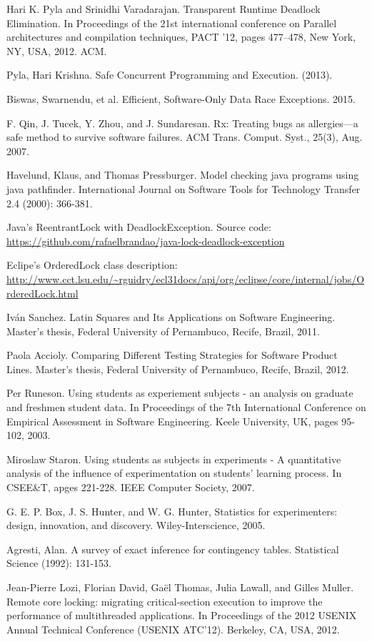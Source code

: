 \begin{thebibliography}{4}
 Hari K. Pyla and Srinidhi Varadarajan. Transparent Runtime Deadlock Elimination. In
Proceedings of the 21st international conference on Parallel architectures and compilation
techniques, PACT ’12, pages 477–478, New York, NY, USA, 2012. ACM.

 Pyla, Hari Krishna. Safe Concurrent Programming and Execution. (2013).

 Biswas, Swarnendu, et al. Efficient, Software-Only Data Race Exceptions. 2015.

 F. Qin, J. Tucek, Y. Zhou, and J. Sundaresan. Rx: Treating bugs as
allergies---a safe method to survive software failures. ACM Trans. Comput.
Syst., 25(3), Aug. 2007.

 Havelund, Klaus, and Thomas Pressburger. Model checking java programs using java pathfinder. International Journal on Software Tools for Technology Transfer 2.4 (2000): 366-381.

 Java's ReentrantLock with DeadlockException. Source code: \url{https://github.com/rafaelbrandao/java-lock-deadlock-exception}

 Eclipe's OrderedLock class description: \url{http://www.cct.lsu.edu/~rguidry/ecl31docs/api/org/eclipse/core/internal/jobs/OrderedLock.html}

 Iván Sanchez. Latin Squares and Its Applications on Software Engineering. Master's thesis, Federal University of Pernambuco, Recife, Brazil, 2011.

 Paola Accioly. Comparing Different Testing Strategies for Software Product Lines. Master's thesis, Federal University of Pernambuco, Recife, Brazil, 2012.

 Per Runeson. Using students as experiement subjects - an analysis on graduate and freshmen student data. In Proceedings of the 7th International Conference on Empirical Assessment in Software Engineering. Keele University, UK, pages 95-102, 2003.

 Miroslaw Staron. Using students as subjects in experiments - A quantitative analysis of the influence of experimentation on students' learning process. In CSEE\&T, apges 221-228. IEEE Computer Society, 2007.

 G. E. P. Box, J. S. Hunter, and W. G. Hunter, Statistics for experimenters: design, innovation, and discovery. Wiley-Interscience, 2005.

 Agresti, Alan. A survey of exact inference for contingency tables. Statistical Science (1992): 131-153.

 Jean-Pierre Lozi, Florian David, Ga\"{e}l Thomas, Julia Lawall, and Gilles Muller. Remote core locking: migrating critical-section execution to improve the performance of multithreaded applications. In Proceedings of the 2012 USENIX Annual Technical Conference (USENIX ATC'12). Berkeley, CA, USA, 2012.

\end{thebibliography}